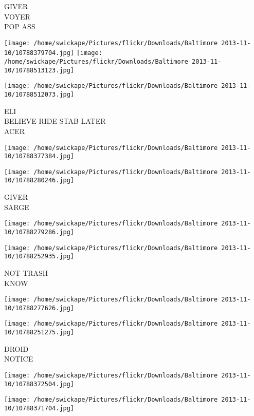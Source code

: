 \documentclass[10pt,letterpaper]{article}
\begin{document}
GIVER\\
VOYER\\
POP ASS
\pagebreak

\texttt{[image: /home/swickape/Pictures/flickr/Downloads/Baltimore 2013-11-10/10788379704.jpg]}
\texttt{[image: /home/swickape/Pictures/flickr/Downloads/Baltimore 2013-11-10/10788513123.jpg]}

\vspace{0.25in}
\texttt{[image: /home/swickape/Pictures/flickr/Downloads/Baltimore 2013-11-10/10788512073.jpg]}

ELI\\
BELIEVE RIDE STAB LATER\\
ACER
\pagebreak

\texttt{[image: /home/swickape/Pictures/flickr/Downloads/Baltimore 2013-11-10/10788377384.jpg]}

\vspace{0.25in}
\texttt{[image: /home/swickape/Pictures/flickr/Downloads/Baltimore 2013-11-10/10788280246.jpg]}

GIVER\\
SARGE
\pagebreak

\texttt{[image: /home/swickape/Pictures/flickr/Downloads/Baltimore 2013-11-10/10788279286.jpg]}

\vspace{0.25in}
\texttt{[image: /home/swickape/Pictures/flickr/Downloads/Baltimore 2013-11-10/10788252935.jpg]}

NOT TRASH\\
KNOW
\pagebreak

\texttt{[image: /home/swickape/Pictures/flickr/Downloads/Baltimore 2013-11-10/10788277626.jpg]}

\vspace{0.25in}
\texttt{[image: /home/swickape/Pictures/flickr/Downloads/Baltimore 2013-11-10/10788251275.jpg]}

DROID\\
NOTICE
\pagebreak

\texttt{[image: /home/swickape/Pictures/flickr/Downloads/Baltimore 2013-11-10/10788372504.jpg]}

\vspace{0.25in}
\texttt{[image: /home/swickape/Pictures/flickr/Downloads/Baltimore 2013-11-10/10788371704.jpg]}
\end{document}
